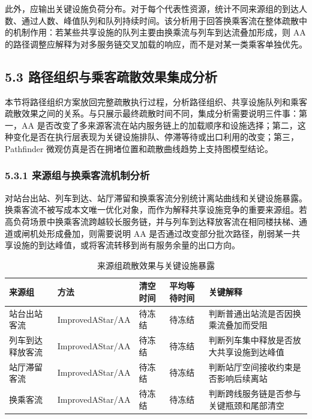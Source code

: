 \documentclass[UTF8,a4paper,12pt]{ctexart}
\begin{document}
此外，应输出关键设施负荷分布。对于每个代表性资源，统计不同来源组的到达人数、通过人数、峰值队列和队列持续时间。该分析用于回答换乘客流在整体疏散中的机制作用：若某些共享设施的队列主要由换乘流与列车到达流叠加形成，则 AA 的路径调整应解释为对多服务链交叉加载的响应，而不是对某一类乘客单独优先。

\subsection{5.3 路径组织与乘客疏散效果集成分析}

本节将路径组织方案放回完整疏散执行过程，分析路径组织、共享设施队列和乘客疏散效果之间的关系。与只展示最终疏散时间不同，集成分析需要说明三件事：第一，AA 是否改变了多来源客流在站内服务链上的加载顺序和设施选择；第二，这种变化是否在执行层表现为关键设施排队、停滞等待或出口利用的改变；第三，Pathfinder 微观仿真是否在拥堵位置和疏散曲线趋势上支持图模型结论。

\subsubsection{5.3.1 来源组与换乘客流机制分析}

对站台出站、列车到达、站厅滞留和换乘客流分别统计离站曲线和关键设施暴露。换乘客流不被写成本文唯一优化对象，而作为解释共享设施竞争的重要来源组。若高负荷场景中换乘客流跨越较长服务链，并与列车到达释放客流在相同楼扶梯、通道或闸机处形成叠加，则需要说明 AA 是否通过改变部分批次路径，削弱某一共享设施的到达峰值，或将客流转移到尚有服务余量的出口方向。

\begin{table}[htbp]
\centering
\caption{来源组疏散效果与关键设施暴露}
\small
\begin{tabular}{p{}p{}p{}p{}p{}}
\toprule
来源组 & 方法 & 清空时间 & 平均等待时间 & 关键解释 \\
\midrule
站台出站客流 & ImprovedAStar/AA & 待冻结 & 待冻结 & 判断普通出站流是否因换乘流叠加而受阻 \\
列车到达释放客流 & ImprovedAStar/AA & 待冻结 & 待冻结 & 判断列车集中释放是否放大共享设施到达峰值 \\
站厅滞留客流 & ImprovedAStar/AA & 待冻结 & 待冻结 & 判断站厅空间接收约束是否影响后续离站 \\
换乘客流 & ImprovedAStar/AA & 待冻结 & 待冻结 & 判断跨线服务链是否参与关键瓶颈和尾部清空 \\
\bottomrule
\end{tabular}
\end{table}
\end{document}
